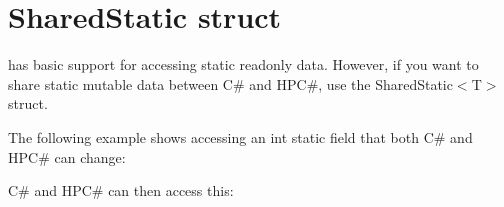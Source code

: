 \chapter{Shared\+Static struct}
\hypertarget{md__hey_tea_9_2_library_2_package_cache_2com_8unity_8burst_0d1_88_87_2_documentation_0i_2csharp-shared-static}{}\label{md__hey_tea_9_2_library_2_package_cache_2com_8unity_8burst_0d1_88_87_2_documentation_0i_2csharp-shared-static}
\label{md__hey_tea_9_2_library_2_package_cache_2com_8unity_8burst_0d1_88_87_2_documentation_0i_2csharp-shared-static_autotoc_md355}%
%
  has basic support for accessing static readonly data. However, if you want to share static mutable data between C\# and HPC\#, use the {\ttfamily Shared\+Static\texorpdfstring{$<$}{<}T\texorpdfstring{$>$}{>}} struct.

The following example shows accessing an {\ttfamily int} static field that both C\# and HPC\# can change\+:


\begin{DoxyCode}{0}
\DoxyCodeLine{\textcolor{preprocessor}{\#}}
\DoxyCodeLine{\ \ \ \{}
\DoxyCodeLine{}
\DoxyCodeLine{\ \ \ \ \ \ \ \textcolor{comment}{//\ Define\ a\ Key\ type\ to\ identify\ IntField}}
\DoxyCodeLine{\ \ \ \}}

\end{DoxyCode}


C\# and HPC\# can then access this\+:


\begin{DoxyCode}{0}
\DoxyCodeLine{\textcolor{preprocessor}{\#}}
\DoxyCodeLine{\ \ \ \textcolor{comment}{//\ Write\ to\ a\ shared\ static\ }}
\DoxyCodeLine{\ \ \ \textcolor{comment}{//\ Read\ from\ a\ shared\ static}}

\end{DoxyCode}


